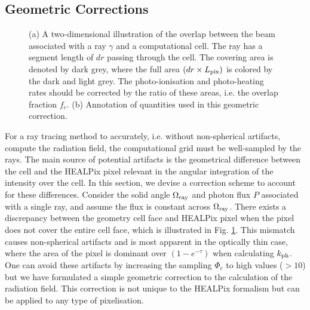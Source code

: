 \documentclass[useAMS,usenatbib]{mn2e}
\begin{document}
\subsection{Geometric Corrections}
\label{sec:meth_fc}

\begin{figure}
  \caption{\label{fig:covering} (a) A two-dimensional illustration of
    the overlap between the beam associated with a ray $\gamma$ and a
    computational cell.  The ray has a segment length of $dr$ passing
    through the cell.  The covering area is denoted by dark grey,
    where the full area $(dr \times L_{\rm pix})$ is colored by the
    dark and light grey.  The photo-ionisation and photo-heating rates
    should be corrected by the ratio of these areas, i.e. the overlap
    fraction $f_c$.  (b) Annotation of quantities used in this
    geometric correction.}
\end{figure}

For a ray tracing method to accurately, i.e. without non-spherical
artifacts, compute the radiation field, the computational grid must be
well-sampled by the rays.  The main source of potential artifacts is
the geometrical difference between the cell and the HEALPix pixel
relevant in the angular integration of the intensity over the cell.
In this section, we devise a correction scheme to account for these
differences.  Consider the solid angle $\Omega_{\rm ray}$ and photon
flux $P$ associated with a single ray, and assume the flux is constant
across $\Omega_{\rm ray}$.  There exists a discrepancy between the
geometry cell face and HEALPix pixel when the pixel does not cover the
entire cell face, which is illustrated in Fig. \ref{fig:covering}.
This mismatch causes non-spherical artifacts and is most apparent in
the optically thin case, where the area of the pixel is dominant over
$(1 - e^{-\tau})$ when calculating $k_{\rm ph}$.  One can avoid these
artifacts by increasing the sampling $\Phi_c$ to high values ($>10$)
but we have formulated a simple geometric correction to the
calculation of the radiation field.  This correction is not unique to
the HEALPix formalism but can be applied to any type of pixelisation.
\end{document}
